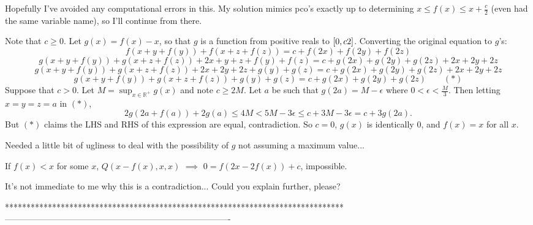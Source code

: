 \begin{solution}
	Hopefully I've avoided any computational errors in this. My solution mimics pco's exactly up to determining $x \leq f(x) \leq x + \frac{c}{2}$ (even had the same variable name), so I'll continue from there.

Note that $c \geq 0$. Let $g(x) = f(x) - x$, so that $g$ is a function from positive reals to $[0, c\/2]$. Converting the original equation to $g$'s:
\[f(x+y+f(y)) + f(x+z+f(z)) = c + f(2x) + f(2y) + f(2z)\]
\[g(x+y+f(y)) + g(x+z+f(z)) + 2x+y+z+f(y)+f(z) = c + g(2x) + g(2y) + g(2z) + 2x + 2y + 2z\]
\[g(x+y+f(y)) + g(x+z+f(z)) + 2x+2y+2z+g(y)+g(z) = c + g(2x) + g(2y) + g(2z) + 2x + 2y + 2z\]
\[g(x+y+f(y)) + g(x+z+f(z)) + g(y)+g(z) = c + g(2x) + g(2y) + g(2z) \qquad (\ast)\]
Suppose that $c > 0$. Let $M = \sup_{x \in \mathbb{R}^+} g(x)$ and note $c \geq 2M$. Let $a$ be such that $g(2a) = M - \epsilon$ where $0 < \epsilon < \frac{M}{3}$. Then letting $x = y = z = a$ in $(\ast)$,
\[2g(2a+f(a)) + 2g(a) \leq 4M < 5M - 3\epsilon \leq c + 3M - 3\epsilon = c + 3g(2a).\]
But $(\ast)$ claims the LHS and RHS of this expression are equal, contradiction. So $c = 0$, $g(x)$ is identically 0, and $f(x) = x$ for all $x$.

Needed a little bit of ugliness to deal with the possibility of $g$ not assuming a maximum value...
\end{solution}



\begin{solution}
	\begin{tcolorbox}If $f(x)<x$ for some $x$, $Q(x-f(x),x,x)$ $\implies$ $0=f(2x-2f(x))+c$, impossible.\end{tcolorbox}

It's not immediate to me why this is a contradiction... Could you explain further, please?
\end{solution}



*******************************************************************************
-------------------------------------------------------------------------------

